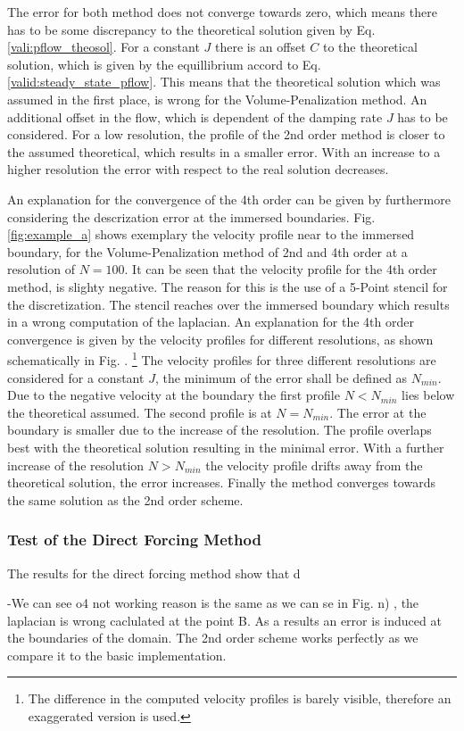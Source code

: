 The error for both method does not converge towards zero, which means there has to be some discrepancy to the theoretical solution given by
Eq. \ref{vali:pflow_theosol}.
For a constant $J$ there is an offset $C$ to the theoretical solution,
which is given by the equillibrium accord to Eq.  \ref{valid:steady_state_pflow}.
This means that the theoretical solution which was assumed in the first place, is wrong for the Volume-Penalization method.
An additional offset in the flow, which is dependent of the damping rate $J$ has to be considered.
For a low resolution, the profile of the 2nd order method is closer to the assumed theoretical, which results in a smaller
error. With an increase to a higher resolution the error with respect to the real solution decreases.

An explanation for the convergence of the 4th order can be given by furthermore considering the descrization error at the immersed boundaries.
Fig. \ref{fig:example_a} shows exemplary the velocity profile near to the immersed boundary, for the Volume-Penalization method of 2nd and 4th order
at a resolution of $N=100$.
It can be seen that the velocity profile for the 4th order method, is slighty negative.
The reason for this is the use of a 5-Point stencil for the discretization.
The stencil reaches over the immersed boundary which results in a wrong computation of the laplacian.
An explanation for the 4th order convergence is given by the velocity profiles for different resolutions,
as shown schematically in Fig. \label{fig:example_b}.
\footnote{The difference in the computed velocity profiles is barely visible, therefore an exaggerated version is used.}
The velocity profiles for three different resolutions are considered for a constant $J$,
the minimum of the error shall be defined as $N_{min}$.
Due to the negative velocity at the boundary the first profile $N<N_{min}$ lies below the theoretical assumed.
The second profile is at $N=N_{min}$. The error at the boundary is smaller due to the increase of the resolution.
The profile overlaps best with the theoretical solution resulting in the minimal error.
With a further increase of the resolution  $N>N_{min}$ the velocity profile drifts away from the theoretical solution,
the error increases.  Finally the method converges towards the same solution as the 2nd order scheme.


\subsubsection{Test of the Direct Forcing Method}

The results for the direct forcing method show that d


-We can see o4 not working reason is the same as we can se in Fig. n) , the laplacian is wrong caclulated at the point B.
As a results an error is induced at the boundaries of the domain.
The 2nd order scheme works perfectly as we compare it to the basic implementation.

